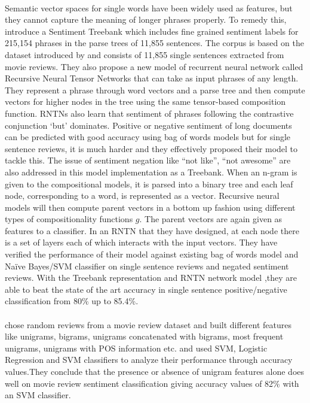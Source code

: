 \documentclass[a4paper,26pt]{article}
\begin{document}
\paragraph{}
Semantic vector spaces for single words have been widely used as features, but they cannot capture the meaning of longer phrases properly. To remedy this, \cite{socher2013recursive} introduce a Sentiment Treebank which includes fine grained sentiment labels for 215,154 phrases in the parse trees of 11,855 sentences. The corpus is based on the dataset introduced by \cite{pang2005seeing} and consists of 11,855 single sentences extracted from movie reviews. They also propose a new model of recurrent neural network called Recursive Neural Tensor Networks that can take as input phrases of any length. They represent a phrase through word vectors and a parse tree and then compute vectors for higher nodes in the tree using the same tensor-based composition function. RNTNs also learn that sentiment of phrases following the contrastive conjunction ‘but’ dominates. Positive or negative sentiment of long documents can be predicted with good accuracy using bag of words models but for single sentence reviews, it is much harder and they effectively proposed their model to tackle this. The issue of sentiment negation like ``not like'', ``not awesome'' are also addressed in this model implementation as a Treebank. When an n-gram is given to the compositional models, it is parsed into a binary tree and each leaf node, corresponding to a word, is represented as a vector. Recursive neural models will then compute parent vectors in a bottom up fashion using different types of compositionality functions $g$. The parent vectors are again given as features to a classifier. In an RNTN that they have designed, at each node there is a set of layers each of which interacts with the input vectors. They have verified the performance of their model against existing bag of words model and Naïve Bayes/SVM classifier on single sentence reviews and negated sentiment reviews. With the Treebank representation and RNTN network model ,they are able to beat the state of the art accuracy in single sentence positive/negative classification from 80\% up to 85.4\%.

\paragraph{}
\cite{pang2002thumbs} chose random reviews from a movie review dataset and built different features like unigrams, bigrams, unigrams concatenated with bigrams, most frequent unigrams, unigrams with POS information etc. and used SVM, Logistic Regression and SVM classifiers to analyze their performance through accuracy values.They conclude that the presence or absence of unigram features alone does well on movie review sentiment classification giving accuracy values of 82\% with an SVM classifier. 
\end{document}
